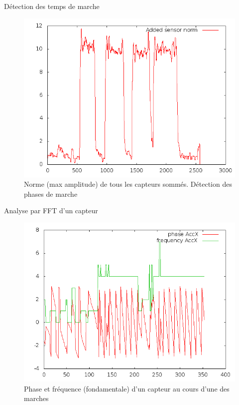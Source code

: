 \documentclass{beamer}
\begin{document}
\begin{frame}{Détection des temps de marche}
    \begin{figure}[h]
        \includegraphics[scale=0.4]{../report/walks.png}
        \caption{Norme (max amplitude) de tous les capteurs sommés. Détection des phases de marche}
    \end{figure}
\end{frame}

\begin{frame}{Analyse par FFT d'un capteur}
    \begin{figure}[h]
        \includegraphics[scale=0.4]{../report/phase_freq.png}
        \caption{Phase et fréquence (fondamentale) d'un capteur au cours d'une des marches}
    \end{figure}
\end{frame}
\end{document}
